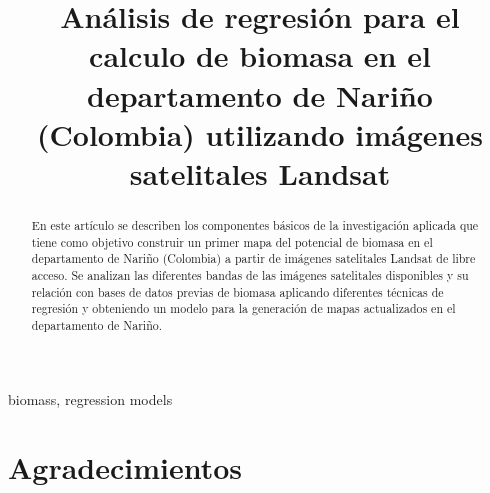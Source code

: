 \documentclass[conference, spanish]{IEEEtran}
\begin{document}
\pagestyle{empty}  

\title{Análisis de regresión para el calculo de biomasa en el departamento de Nariño (Colombia) utilizando imágenes satelitales Landsat}

\author{
\and
{}
}

\maketitle

\begin{abstract}

En este artículo se describen los componentes básicos de 
la investigación aplicada que tiene como objetivo construir un
primer mapa del potencial de biomasa en el departamento de Nariño (Colombia) a
partir de imágenes satelitales Landsat de libre acceso. Se 
analizan las diferentes bandas de las imágenes satelitales disponibles y
su relación con bases de datos previas de biomasa aplicando diferentes técnicas de regresión y obteniendo un modelo
para la generación de mapas actualizados en el departamento de Nariño.

\end{abstract}


\begin{IEEEkeywords}
biomass, regression models 
\end{IEEEkeywords}

\thispagestyle{empty} 

\IEEEpeerreviewmaketitle





%




\ifCLASSOPTIONcompsoc
  \section*{Agradecimientos}
\else
\end{document}
